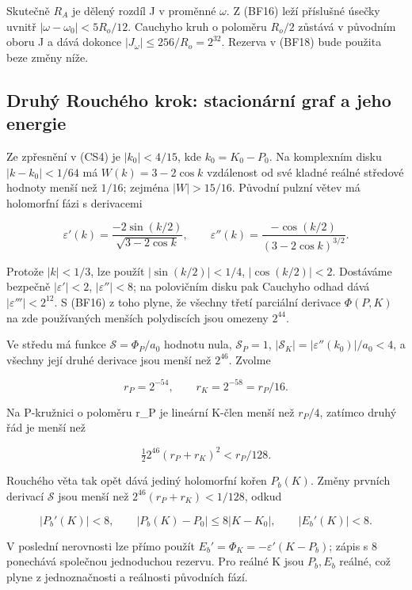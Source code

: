 \documentclass[11pt,a4paper]{article}
\theoremstyle{remark}\newtheorem{remark}[theorem]{Poznámka}
\numberwithin{equation}{section}
\begin{document}
Skutečně \(R_A\) je dělený rozdíl J v proměnné \(\omega\). Z (BF16) leží
příslušné úsečky uvnitř \(|\omega-\omega_0|<5R_o/12\). Cauchyho kruh o
poloměru \(R_o/2\) zůstává v původním oboru J a dává dokonce
\(|J_\omega|\le256/R_o=2^{32}\). Rezerva v (BF18) bude použita beze
změny níže.

\hypertarget{druhuxfd-rouchuxe9ho-krok-stacionuxe1rnuxed-graf-a-jeho-energie}{%
\subsection{Druhý Rouchého krok: stacionární graf a jeho
energie}\label{druhuxfd-rouchuxe9ho-krok-stacionuxe1rnuxed-graf-a-jeho-energie}}

Ze zpřesnění v (CS4) je \(|k_0|<4/15\), kde \(k_0=K_0-P_0\). Na
komplexním disku \(|k-k_0|<1/64\) má \(W(k)=3-2\cos k\) vzdálenost od
své kladné reálné středové hodnoty menší než \(1/16\); zejména
\(|W|>15/16\). Původní pulzní větev má holomorfní fázi s derivacemi

\[
\varepsilon'(k)=\frac{-2\sin(k/2)}{\sqrt{3-2\cos k}},\qquad
\varepsilon''(k)=\frac{-\cos(k/2)}{(3-2\cos k)^{3/2}}.
\]

Protože \(|k|<1/3\), lze použít \(|\sin(k/2)|<1/4\), \(|\cos(k/2)|<2\).
Dostáváme bezpečně \(|\varepsilon'|<2\), \(|\varepsilon''|<8\); na
polovičním disku pak Cauchyho odhad dává \(|\varepsilon'''|<2^{12}\). S
(BF16) z toho plyne, že všechny třetí parciální derivace \(\Phi(P,K)\)
na zde používaných menších polydiscích jsou omezeny \(2^{44}\).

Ve středu má funkce \(\mathcal S=\Phi_P/a_0\) hodnotu nula,
\(\mathcal S_P=1\), \(|\mathcal S_K|=|\varepsilon''(k_0)|/a_0<4\), a
všechny její druhé derivace jsou menší než \(2^{46}\). Zvolme

\[
r_P=2^{-54},\qquad r_K=2^{-58}=r_P/16.
\tag{BF19}
\]

Na P-kružnici o poloměru r\_P je lineární K-člen menší než \(r_P/4\),
zatímco druhý řád je menší než

\[
\tfrac12 2^{46}(r_P+r_K)^2<r_P/128.
\]

Rouchého věta tak opět dává jediný holomorfní kořen \(P_b(K)\). Změny
prvních derivací \(\mathcal S\) jsou menší než
\(2^{46}(r_P+r_K)<1/128\), odkud

\[
|P_b'(K)|<8,\qquad
|P_b(K)-P_0|\le8|K-K_0|,
\qquad |E_b'(K)|<8.
\tag{BF20}
\]

V poslední nerovnosti lze přímo použít
\(E_b'=\Phi_K=-\varepsilon'(K-P_b)\); zápis s 8 ponechává společnou
jednoduchou rezervu. Pro reálné K jsou \(P_b,E_b\) reálné, což plyne z
jednoznačnosti a reálnosti původních fází.
\end{document}
